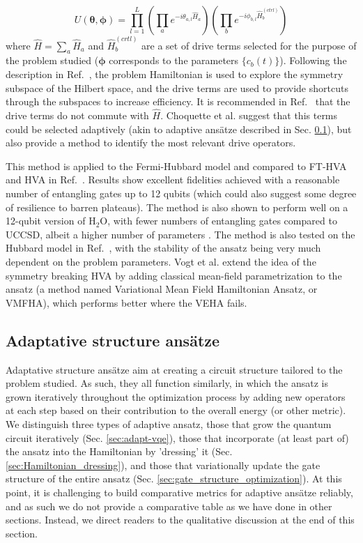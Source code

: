 \begin{equation}
    U(\boldsymbol{\theta}, \boldsymbol{\phi}) = \prod_{l=1}^L \left( \prod_a e^{-i \theta_{a, l} \hat{H}_a} \right) \left( \prod_b e^{-i \phi_{b, l} \hat{H}^{(ctrl)}_b} \right) 
\end{equation}
where $\hat{H} = \sum_a \hat{H}_a$ and $\hat{H}^{(crtl)}_b$ are a set of drive terms selected for the purpose of the problem studied ($\boldsymbol{\phi}$ corresponds to the parameters $\{c_b(t)\}$). Following the description in Ref.~\cite{Choquette2021}, the problem Hamiltonian is used to explore the symmetry subspace of the Hilbert space, and the drive terms are used to provide shortcuts through the subspaces to increase efficiency. It is recommended in Ref.~\cite{Choquette2021} that the drive terms do not commute with $\hat{H}$. Choquette et al. suggest that this terms could be selected adaptively (akin to adaptive ans{\"{a}}tze described in Sec. \ref{sec:adaptive_ansatz}), but also provide a method to identify the most relevant drive operators. 

This method is applied to the Fermi-Hubbard model and compared to FT-HVA and HVA in Ref.~\cite{Choquette2021}. Results show excellent fidelities achieved with a reasonable number of entangling gates up to 12 qubits (which could also suggest some degree of resilience to barren plateaus). The method is also shown to perform well on a 12-qubit version of $\mathrm{H_2O}$, with fewer numbers of entangling gates compared to UCCSD, albeit a higher number of parameters \cite{Choquette2021}. The method is also tested on the Hubbard model in Ref.~\cite{Vogt2020}, with the stability of the ansatz being very much dependent on the problem parameters. Vogt et al. \cite{Vogt2020} extend the idea of the symmetry breaking HVA by adding classical mean-field parametrization to the ansatz (a method named Variational Mean Field Hamiltonian Ansatz, or VMFHA), which performs better where the VEHA fails. 

\subsection{Adaptative structure ans{\"{a}}tze}  \label{sec:adaptive_ansatz}

Adaptative structure ans{\"{a}}tze aim at creating a circuit structure tailored to the problem studied. As such, they all function similarly, in which the ansatz is grown iteratively throughout the optimization process by adding new operators at each step based on their contribution to the overall energy (or other metric). We distinguish three types of adaptive ansatz, those that grow the quantum circuit iteratively (Sec. \ref{sec:adapt-vqe}), those that incorporate (at least part of) the ansatz into the Hamiltonian by 'dressing' it (Sec. \ref{sec:Hamiltonian_dressing}), and those that variationally update the gate structure of the entire ansatz (Sec. \ref{sec:gate_structure_optimization}). At this point, it is challenging to build comparative metrics for adaptive ans\"atze reliably, and as such we do not provide a comparative table as we have done in other sections. Instead, we direct readers to the qualitative discussion at the end of this section. 

